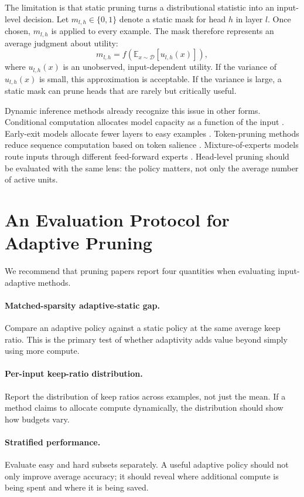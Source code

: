 \documentclass{article}
\begin{document}
The limitation is that static pruning turns a distributional statistic into an
input-level decision. Let $m_{l,h} \in \{0,1\}$ denote a static mask for head
$h$ in layer $l$. Once chosen, $m_{l,h}$ is applied to every example. The mask
therefore represents an average judgment about utility:
\[
  m_{l,h} = f\left(\mathbb{E}_{x \sim \mathcal{D}}[u_{l,h}(x)]\right),
\]
where $u_{l,h}(x)$ is an unobserved, input-dependent utility. If the variance
of $u_{l,h}(x)$ is small, this approximation is acceptable. If the variance is
large, a static mask can prune heads that are rarely but critically useful.

Dynamic inference methods already recognize this issue in other forms.
Conditional computation allocates model capacity as a function of the input
\citep{bengio2015conditional}.
Early-exit models allocate fewer layers to easy examples
\citep{graves2016adaptive,schuster2022confident}. Token-pruning methods reduce
sequence computation based on token salience
\citep{goyal2020power,wang2021spatten}. Mixture-of-experts models route inputs
through different feed-forward experts \citep{shazeer2017outrageously,fedus2022switch}.
Head-level pruning should be evaluated with the same lens: the policy matters,
not only the average number of active units.

\section{An Evaluation Protocol for Adaptive Pruning}

We recommend that pruning papers report four quantities when evaluating
input-adaptive methods.

\paragraph{Matched-sparsity adaptive-static gap.}
Compare an adaptive policy against a static policy at the same average keep
ratio. This is the primary test of whether adaptivity adds value beyond simply
using more compute.

\paragraph{Per-input keep-ratio distribution.}
Report the distribution of keep ratios across examples, not just the mean. If a
method claims to allocate compute dynamically, the distribution should show how
budgets vary.

\paragraph{Stratified performance.}
Evaluate easy and hard subsets separately. A useful adaptive policy should not
only improve average accuracy; it should reveal where additional compute is
being spent and where it is being saved.
\end{document}
